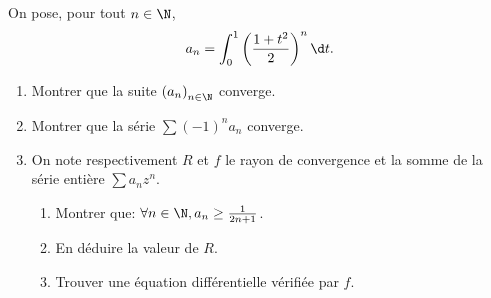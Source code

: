 \begin{enonce}
\begin{exercise}[ID={RMS132 E1170},subtitle={CCINP PSI 2021},tags={}]
On pose, pour tout $n\in\N$,
\begin{equation*}
  a_n = \int_0^1 \left( \frac{1+t^2}{2} \right)^n \d t. 
\end{equation*}
\begin{enumerate}
  \item Montrer que la suite $\left( a_n \right)_{n\in\N}$ converge.
  \item Montrer que la série $\sum (-1)^n a_n$ converge.
  \item On note respectivement $R$ et $f$ le rayon de convergence et la somme de la série entière $\sum a_n z^n$.
    \begin{enumerate}
      \item Montrer que: $\forall n\in\N, a_n \geq \frac{1}{2n+1}$.
      \item En déduire la valeur de $R$.
      \item Trouver une équation différentielle vérifiée par $f$.
    \end{enumerate}
\end{enumerate}
\end{exercise}
\begin{solution}
\end{solution}
\end{enonce}
